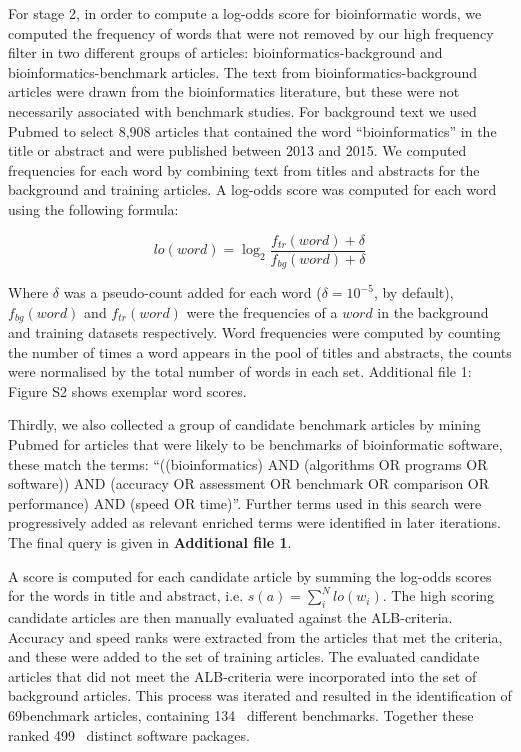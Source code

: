\documentclass{bmcart}
\def\numTools{499}
\def\numBenchmarkPubs{69}
\def\numBenchmarks{134}
\begin{document}
For stage 2, in order to compute a log-odds score for bioinformatic
words, we computed the frequency of words that were not removed by our
high frequency filter in two different groups of articles:
bioinformatics-background and bioinformatics-benchmark articles. The
text from bioinformatics-background articles were drawn from the
bioinformatics literature, but these were not necessarily associated
with benchmark studies. For background text we used Pubmed
\cite{Sayers2010-vm,McEntyre2001-fl} to select 8,908 articles that
contained the word “bioinformatics” in the title or abstract and were
published between 2013 and 2015. We computed frequencies for each word
by combining text from titles and abstracts for the background and
training articles. A log-odds score was computed for each word using
the following formula:

\[lo(word)=\log_2\frac{f_{tr}(word)+\delta}{f_{bg}(word)+\delta}\] 

Where
$\delta$
was a pseudo-count added for each word ($\delta = 10^{-5}$, by default),
$f_{bg}(word)$ and $f_{tr}(word)$ were the frequencies of a $word$ in
the background and training datasets respectively. Word frequencies
were computed by counting the number of times a word appears in the
pool of titles and abstracts, the counts were normalised by the total
number of words in each set. {\color{black}Additional file 1: Figure S2 shows exemplar word scores. }

Thirdly, we also collected a group of candidate benchmark articles by
mining Pubmed for articles that were likely to be benchmarks of
bioinformatic software, these match the terms: “((bioinformatics)
AND (algorithms OR programs OR software)) AND (accuracy OR assessment
OR benchmark OR comparison OR performance) AND (speed OR
time)”. Further terms used in this search were progressively added as
relevant enriched terms were identified in later iterations. The final
query is given in {\color{black} \textbf{Additional file 1}}.

A score is computed for each candidate article by summing the log-odds
scores for the words in title and abstract,
i.e. $s(a)=\sum_i^Nlo(w_i)$. The high scoring candidate articles are
then manually evaluated against the ALB-criteria. Accuracy and speed
ranks were extracted from the articles that met the criteria, and
these were added to the set of training articles. The evaluated
candidate articles that did not meet the ALB-criteria were incorporated
into the set of background articles. This process was iterated and resulted in the identification of
\numBenchmarkPubs benchmark articles,
containing \numBenchmarks~ different benchmarks. Together these
ranked \numTools~ distinct software packages.
\end{document}
